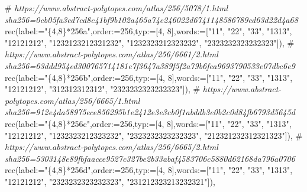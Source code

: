 \documentclass[
  10pt,
  letterpaper,
]{article}
\newenvironment{Shaded}{}{}
\newcommand{\CommentTok}[1]{\textcolor[rgb]{0.38,0.63,0.69}{\textit{#1}}}
\newcommand{\ExtensionTok}[1]{#1}
\newcommand{\FloatTok}[1]{\textcolor[rgb]{0.25,0.63,0.44}{#1}}
\newcommand{\NormalTok}[1]{#1}
\newcommand{\OperatorTok}[1]{\textcolor[rgb]{0.40,0.40,0.40}{#1}}
\newcommand{\StringTok}[1]{\textcolor[rgb]{0.25,0.44,0.63}{#1}}
\newcommand{\VariableTok}[1]{\textcolor[rgb]{0.10,0.09,0.49}{#1}}
\begin{document}
\begin{Shaded}
\begin{Highlighting}[]
\NormalTok{\#}\CommentTok{ https://www.abstract{-}polytopes.com/atlas/256/5078/1.html sha256=0cb05fa3ed7cd8c41bf9b102a465a74e246022d6741148586789ed63d22d4a68}
\ExtensionTok{rec}\NormalTok{(}\VariableTok{label}\OperatorTok{:=}\StringTok{"\{4,8\}*256a"}\OperatorTok{,}\VariableTok{order}\OperatorTok{:=}\FloatTok{256}\OperatorTok{,}\VariableTok{typ}\OperatorTok{:=}\NormalTok{[}\FloatTok{4}\OperatorTok{,} \FloatTok{8}\NormalTok{]}\OperatorTok{,}\VariableTok{words}\OperatorTok{:=}\NormalTok{[}\StringTok{"11"}\OperatorTok{,} \StringTok{"22"}\OperatorTok{,} \StringTok{"33"}\OperatorTok{,} \StringTok{"1313"}\OperatorTok{,} \StringTok{"12121212"}\OperatorTok{,} \StringTok{"1232123212321232"}\OperatorTok{,} \StringTok{"1232323212323232"}\OperatorTok{,} \StringTok{"2323232323232323"}\NormalTok{])}\OperatorTok{,}
\NormalTok{\#}\CommentTok{ https://www.abstract{-}polytopes.com/atlas/256/6661/2.html sha256=63ddd954ed300765714181e7f3647a389f5f2a79b6fea9693790533e07dbc6e9}
\ExtensionTok{rec}\NormalTok{(}\VariableTok{label}\OperatorTok{:=}\StringTok{"\{4,8\}*256b"}\OperatorTok{,}\VariableTok{order}\OperatorTok{:=}\FloatTok{256}\OperatorTok{,}\VariableTok{typ}\OperatorTok{:=}\NormalTok{[}\FloatTok{4}\OperatorTok{,} \FloatTok{8}\NormalTok{]}\OperatorTok{,}\VariableTok{words}\OperatorTok{:=}\NormalTok{[}\StringTok{"11"}\OperatorTok{,} \StringTok{"22"}\OperatorTok{,} \StringTok{"33"}\OperatorTok{,} \StringTok{"1313"}\OperatorTok{,} \StringTok{"12121212"}\OperatorTok{,} \StringTok{"312312312312"}\OperatorTok{,} \StringTok{"2323232323232323"}\NormalTok{])}\OperatorTok{,}
\NormalTok{\#}\CommentTok{ https://www.abstract{-}polytopes.com/atlas/256/6665/1.html sha256=912e4da58975ece856295b1e2412e3e3cb0f1abddb3e0b2c0d84fb6793d5645d}
\ExtensionTok{rec}\NormalTok{(}\VariableTok{label}\OperatorTok{:=}\StringTok{"\{4,8\}*256c"}\OperatorTok{,}\VariableTok{order}\OperatorTok{:=}\FloatTok{256}\OperatorTok{,}\VariableTok{typ}\OperatorTok{:=}\NormalTok{[}\FloatTok{4}\OperatorTok{,} \FloatTok{8}\NormalTok{]}\OperatorTok{,}\VariableTok{words}\OperatorTok{:=}\NormalTok{[}\StringTok{"11"}\OperatorTok{,} \StringTok{"22"}\OperatorTok{,} \StringTok{"33"}\OperatorTok{,} \StringTok{"1313"}\OperatorTok{,} \StringTok{"12121212"}\OperatorTok{,} \StringTok{"1232323212323232"}\OperatorTok{,} \StringTok{"2323232323232323"}\OperatorTok{,} \StringTok{"212321232312321323"}\NormalTok{])}\OperatorTok{,}
\NormalTok{\#}\CommentTok{ https://www.abstract{-}polytopes.com/atlas/256/6665/2.html sha256=5303148e89fbfaacce9527c327be2b33abaf4583706c5880d62168da796a0706}
\ExtensionTok{rec}\NormalTok{(}\VariableTok{label}\OperatorTok{:=}\StringTok{"\{4,8\}*256d"}\OperatorTok{,}\VariableTok{order}\OperatorTok{:=}\FloatTok{256}\OperatorTok{,}\VariableTok{typ}\OperatorTok{:=}\NormalTok{[}\FloatTok{4}\OperatorTok{,} \FloatTok{8}\NormalTok{]}\OperatorTok{,}\VariableTok{words}\OperatorTok{:=}\NormalTok{[}\StringTok{"11"}\OperatorTok{,} \StringTok{"22"}\OperatorTok{,} \StringTok{"33"}\OperatorTok{,} \StringTok{"1313"}\OperatorTok{,} \StringTok{"12121212"}\OperatorTok{,} \StringTok{"2323232323232323"}\OperatorTok{,} \StringTok{"231212323213232321"}\NormalTok{])}\OperatorTok{,}

\end{Highlighting}
\end{Shaded}
\end{document}

